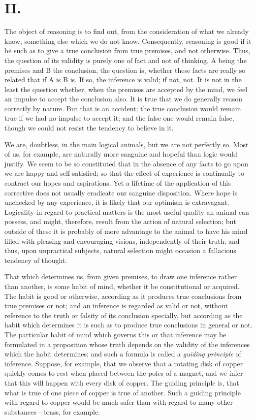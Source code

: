 \section{II.}

The object of reasoning is to find out, from the consideration of what
we already know, something else which we do not know. Consequently,
reasoning is good if it be such as to give a true conclusion from true
premises, and not otherwise. Thus, the question of its validity is
purely one of fact and not of thinking. A being the premises and B the
conclusion, the question is, whether these facts are really so related
that if A is B is. If so, the inference is valid; if not, not. It is
not in the least the question whether, when the premises are accepted
by the mind, we feel an impulse to accept the conclusion also. It is
true that we do generally reason correctly by nature. But that is an
accident; the true conclusion would remain true if we had no impulse
to accept it; and the false one would remain false, though we could
not resist the tendency to believe in it.

We are, doubtless, in the main logical animals, but we are not
perfectly so. Most of us, for example, are naturally more sanguine and
hopeful than logic would justify. We seem to be so constituted that in
the absence of any facts to go upon we are happy and self-satisfied;
so that the effect of experience is continually to contract our hopes
and aspirations. Yet a lifetime of the application of this corrective
does not usually eradicate our sanguine disposition. Where hope is
unchecked by any experience, it is likely that our optimism is
extravagant. Logicality in regard to practical matters is the most
useful quality an animal can possess, and might, therefore, result
from the action of natural selection; but outside of these it is
probably of more advantage to the animal to have his mind filled
with pleasing and encouraging visions, independently of their truth;
and thus, upon unpractical subjects, natural selection might occasion
a fallacious tendency of thought.

That which determines us, from given premises, to draw one
inference rather than another, is some habit of mind, whether it be
constitutional or acquired. The habit is good or otherwise, according
as it produces true conclusions from true premises or not; and an
inference is regarded as valid or not, without reference to the truth
or falsity of its conclusion specially, but according as the habit
which determines it is such as to produce true conclusions in general
or not. The particular habit of mind which governs this or that
inference may be formulated in a proposition whose truth depends on
the validity of the inferences which the habit determines; and such a
formula is called a \textit{guiding principle} of inference. Suppose,
for example, that we observe that a rotating disk of copper quickly
comes to rest when placed between the poles of a magnet, and we infer
that this will happen with every disk of copper. The guiding principle
is, that what is true of one piece of copper is true of another. Such
a guiding principle with regard to copper would be much safer than
with regard to many other sub\-stanc\-es---brass, for example.

